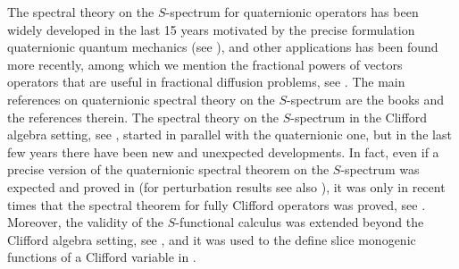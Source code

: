 \documentclass[reqno,11pt]{amsart}
\numberwithin{equation}{section}
\theoremstyle{definition}
\begin{document}
The spectral theory on the $S$-spectrum for quaternionic operators has been widely developed in the last 15 years motivated by the precise formulation quaternionic quantum mechanics (see \cite{BF,JONAQS}), and other applications has been found more recently,
among which we mention the fractional powers of vectors operators that are useful in fractional diffusion problems, see
\cite{frac4,frac5,frac1}.
The main references on quaternionic spectral theory on the $S$-spectrum
 are the books \cite{6COFBook,6ACSBOOK,FJBOOK,CGKBOOK,6JONAME} and the references therein.
The spectral theory on the $S$-spectrum in the Clifford algebra setting, see \cite{6css}, started in parallel with the quaternionic one,
but in the last few years there have been new and unexpected developments.
 In fact, even if a precise version of the quaternionic
 spectral theorem on the $S$-spectrum was expected and proved in \cite{6SpecThm1}
 (for perturbation results see also \cite{6CCKS}), it was only in recent times that the spectral theorem
 for fully Clifford operators was proved, see
\cite{CLIFST}. Moreover,  the validity of the $S$-functional calculus was extended beyond the Clifford algebra setting, see \cite{UNIV},
and it was used to the define slice monogenic functions of a Clifford variable in \cite{ClifFUN}.
\end{document}
